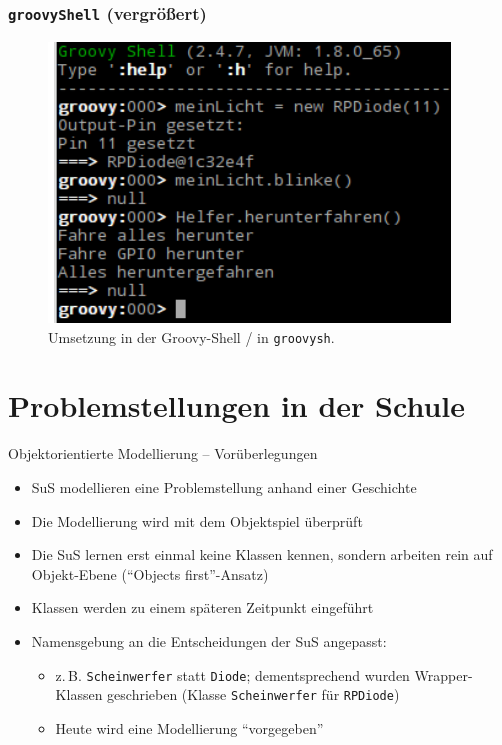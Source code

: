 \documentclass[usenames,dvipsnames]{beamer}
\begin{document}

\begin{frame}
\frametitle{\texttt{groovyShell} (vergrößert)}
\vspace{-0.2em}
\begin{figure}[t]
	\centering
	\includegraphics[width=0.95\textwidth]{img/groovysh_rpCollection_blinkende_diode_text_only.png}
	\caption{Umsetzung in der Groovy-Shell / in \texttt{groovysh}.}
\end{figure}
\end{frame}


\section{Problemstellungen in der Schule}


\begin{frame}{Objektorientierte Modellierung -- Vorüberlegungen}
	\begin{itemize}
		\item SuS modellieren eine Problemstellung anhand einer Geschichte
		\item Die Modellierung wird mit dem Objektspiel überprüft
		\item Die SuS lernen erst einmal keine Klassen kennen, sondern arbeiten rein auf Objekt-Ebene (\enquote{Objects first}-Ansatz)
		\item Klassen werden zu einem späteren Zeitpunkt eingeführt
		\item Namensgebung an die Entscheidungen der SuS angepasst:
		\begin{itemize}
			\item z.\,B. \texttt{Scheinwerfer} statt \texttt{Diode}; dementsprechend wurden Wrapper-Klassen geschrieben (Klasse \texttt{Scheinwerfer} für \texttt{RPDiode})
			\item Heute wird eine Modellierung \enquote{vorgegeben}
		\end{itemize}
	\end{itemize}
\end{frame}
\end{document}
